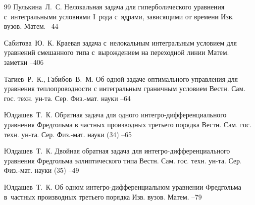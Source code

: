 \begin{thebibliography}{99}
\by Пулькина~Л.~С.
\paper Нелокальная задача для гиперболического уравнения с~интегральными условиями I~рода с~ядрами, зависящими от времени
\jour Изв. вузов. Матем.
--44

\by Сабитова~Ю.~К.
\paper Краевая задача с~нелокальным интегральным условием для уравнений смешанного типа с~вырождением
на переходной линии
\jour Матем. заметки
--406

\by Тагиев~Р.~К., Габибов~В.~М.
\paper Об одной задаче оптимального управления для уравнения теплопроводности с интегральным граничным условием 
\jour Вестн. Сам. гос. техн. ун-та. Сер. Физ.-мат. науки
--64

\by Юлдашев~Т.~К.
\paper Обратная задача для одного интегро-дифференциального уравнения Фредгольма в частных производных третьего порядка
\jour Вестн. Сам. гос. техн. ун-та. Сер. Физ.-мат. науки
(34)
--65

\by Юлдашев~Т.~К.
\paper Двойная обратная задача для интегро-дифференциального уравнения Фредгольма эллиптического типа
\jour Вестн. Сам. гос. техн. ун-та. Сер. Физ.-мат. науки
(35)
--49

\by Юлдашев~Т.~К.
\paper Об одном интегро-дифференциальном уравнении Фредгольма в~частных производных третьего порядка
\jour Изв. вузов. Матем.
--79


\end{thebibliography}
